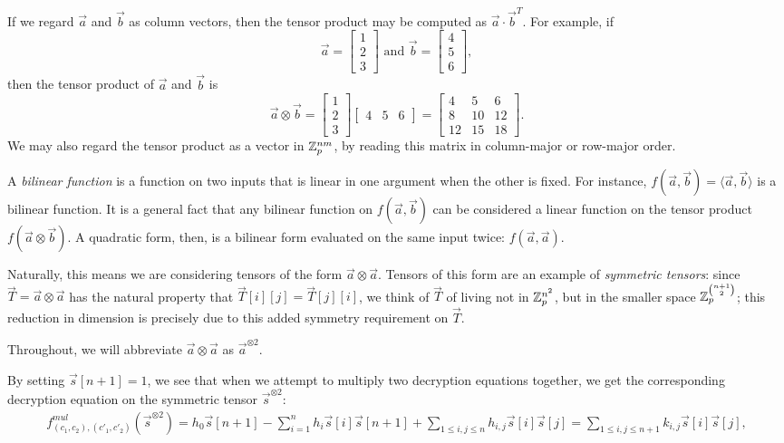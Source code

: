     If we regard $\vec{a}$ and $\vec{b}$ as column vectors, then the tensor product may be computed as $\vec{a} \cdot \vec{b}^T$. For example, if
    \[\vec{a} = \begin{bmatrix} 1 \\ 2 \\ 3 \end{bmatrix} \text{ and } \vec{b} = \begin{bmatrix} 4 \\ 5 \\ 6 \end{bmatrix},\]
    then the tensor product of $\vec{a}$ and $\vec{b}$ is
    \[\vec{a} \otimes \vec{b} = \begin{bmatrix} 1 \\ 2 \\ 3 \end{bmatrix} \begin{bmatrix} 4 & 5 & 6 \end{bmatrix} = \begin{bmatrix} 4 & 5 & 6 \\ 8 & 10 & 12 \\ 12 & 15 & 18 \end{bmatrix}.\]
    We may also regard the tensor product as a vector in $\mathbb{Z}_p^{nm}$, by reading this matrix in column-major or row-major order.

    A \emph{bilinear function} is a function on two inputs that is linear in one argument when the other is fixed. For instance, $f(\vec{a}, \vec{b}) = \langle \vec{a}, \vec{b} \rangle$ is a bilinear function. It is a general fact that any bilinear function on $f(\vec{a}, \vec{b})$ can be considered a linear function on the tensor product $f(\vec{a} \otimes \vec{b})$. A quadratic form, then, is a bilinear form evaluated on the same input twice: $f(\vec{a}, \vec{a})$.

    Naturally, this means we are considering tensors of the form $\vec{a} \otimes \vec{a}$. Tensors of this form are an example of \emph{symmetric tensors}: since $\vec{T} = \vec{a} \otimes \vec{a}$ has the natural property that $\vec{T}[i][j] = \vec{T}[j][i]$, we think of $\vec{T}$ of living not in $\mathbb{Z}_p^{n^2}$, but in the smaller space $\mathbb{Z}_p^{{n+1}\choose{2}}$; this reduction in dimension is precisely due to this added symmetry requirement on $\vec{T}$.

    Throughout, we will abbreviate $\vec{a} \otimes \vec{a}$ as $\vec{a}^{\otimes 2}$.

    By setting $\vec{s}[n+1] = 1$, we see that when we attempt to multiply two decryption equations together, we get the corresponding decryption equation on the symmetric tensor $\vec{s}^{\otimes 2}$:
    \begin{align*}
        f^{mul}_{(c_1, c_2), (c'_1, c'_2)}(\vec{s}^{\otimes 2}) = h_0 \vec{s}[n+1] - \sum_{i = 1}^n h_i \vec{s}[i]\vec{s}[n+1] + \sum_{1 \leq i,j \leq n} h_{i,j} \vec{s}[i] \vec{s}[j]
        = \sum_{1 \leq i,j \leq n+1} k_{i,j} \vec{s}[i]\vec{s}[j],
    \end{align*}

